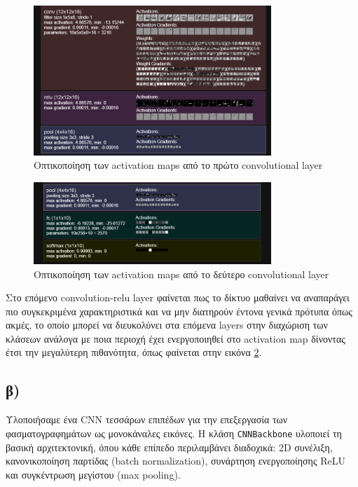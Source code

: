 \documentclass[a4paper,12pt]{article}
\begin{document}
\begin{figure}[h!]
    \centering
    \includegraphics[width=0.8\textwidth]{cnn_1.png}
    \caption{Οπτικοποίηση των activation maps από το πρώτο convolutional layer}
    \label{fig:activation_maps}
\end{figure}

\begin{figure}[h!]
    \centering
    \includegraphics[width=0.8\textwidth]{cnn_2.png}
    \caption{Οπτικοποίηση των activation maps από το δεύτερο convolutional layer}
    \label{fig:activation_maps_2}
\end{figure}

Στο επόμενο convolution-relu layer φαίνεται πως το δίκτυο μαθαίνει να αναπαράγει πιο συγκεκριμένα χαρακτηριστικά και να μην
διατηρούν έντονα γενικά πρότυπα όπως ακμές, το οποίο μπορεί να διευκολύνει στα επόμενα layers στην διαχώριση των κλάσεων
ανάλογα με ποια περιοχή έχει ενεργοποιηθεί στο activation map δίνοντας
έτσι την μεγαλύτερη πιθανότητα, όπως φαίνεται στην εικόνα \ref{fig:activation_maps_2}.

\subsection*{β)}

Υλοποιήσαμε ένα CNN τεσσάρων επιπέδων για την επεξεργασία των φασματογραφημάτων ως μονοκάναλες εικόνες. Η κλάση \texttt{CNNBackbone} υλοποιεί τη βασική αρχιτεκτονική, όπου κάθε επίπεδο περιλαμβάνει διαδοχικά: 2D συνέλιξη, κανονικοποίηση παρτίδας (batch normalization), συνάρτηση ενεργοποίησης ReLU και συγκέντρωση μεγίστου (max pooling).
\end{document}
